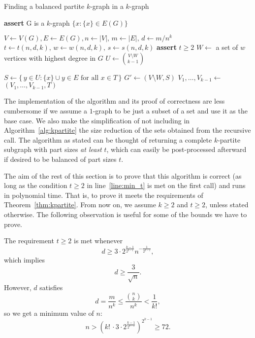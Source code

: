 \begin{algorithm}
    \caption{Finding a balanced partite $k$-graph in a $k$-graph}
    \label{alg:kpartite}
    \begin{algorithmic}[1]
            \State \textbf{assert} G is a $k$-graph
                \State \Return $\{x : \{x\} \in E(G)\}$
            \EndIf

            \State $V \gets V(G), E \gets E(G), n \gets |V|,\, m \gets |E|,\, d \gets m/n^k$
            \State $t \gets t(n, d, k),\, w \gets w(n, d, k),\, s \gets s(n, d, k)$ \label{line:tws}
            \State \textbf{assert} $t \geq 2$ \label{line:min_t}
            \State $W \gets$ a set of $w$ vertices with highest degree in $G$ \label{line:W}
            \State $U \gets \binom{V\setminus W}{k-1}$

             \label{line:for}
                \State $S \gets \{\,y \in U \colon \{x\} \cup y \in E \text{ for all } x \in T\,\}$
                    \State $G' \gets (V \setminus W, S)$ \label{line:rec_call}
                    \State $V_1, \ldots, V_{k-1} \gets$ 
                    \State \Return $(V_1, \ldots, V_{k-1}, T)$ \label{line:return}
                \EndIf
            \EndFor
        \EndFunction
    \end{algorithmic}
\end{algorithm}

The implementation of the algorithm and its proof of correctness are less cumbersome if we assume
a $1$-graph to be just a subset of a set and use it as the base case.
We also make the simplification of not including in Algorithm~\ref{alg:kpartite}
the size reduction of the sets obtained from the recursive call.
The algorithm as stated can be thought of returning a complete $k$-partite
subgraph with part sizes \emph{at least} $t$, which can easily be post-processed
afterward if desired to be balanced of part sizes $t$.

The aim of the rest of this section is to prove that this algorithm is correct
(as long as the  condition $t \geq 2$ in line~\ref{line:min_t} is met on the first call)
and runs in polynomial time.
That is, to prove it meets the requirements of Theorem~\ref{thm:kpartite}.
From now on, we assume $k \geq 2$ and
$t \geq 2$, unless stated otherwise.
The following observation is useful for some of the bounds we have to prove.

\begin{remark}\label{rm:min_d}
    The requirement $t \geq 2$ is met whenever
    \[
        d \geq 3 \cdot 2^{\frac{k - 1}{2^{k-1}}} n^{-\frac{1}{2^{k-1}}},
    \]
    which implies
    \[
        d \geq \frac{3}{\sqrt{n}}.
    \]
    However, $d$ satisfies
    \[
        d = \frac{m}{n^k} \leq \frac{\binom{n}{k}}{n^k} < \frac{1}{k!},
    \]
    so we get a minimum value of $n$:
    \[
        n > \left( k!\, \cdot 3 \cdot 2^{\frac{k-1}{2^{k-1}}} \right)^{2^{k-1}} \geq 72.
    \]
\end{remark}


